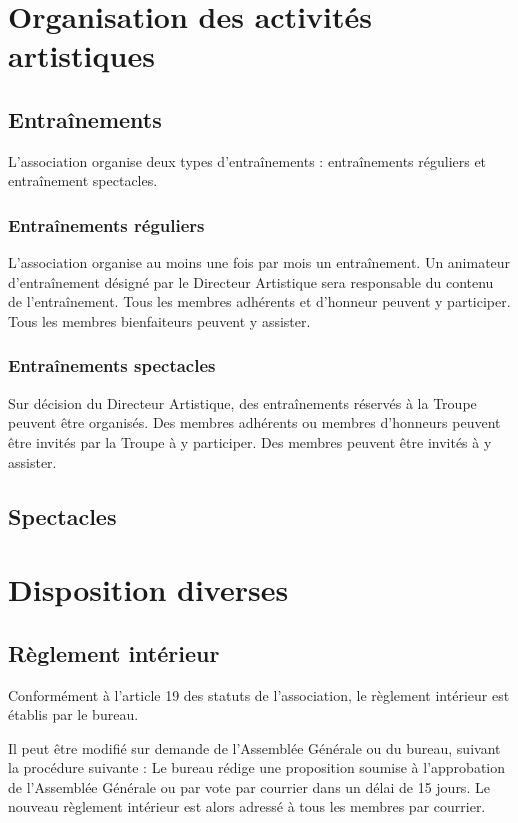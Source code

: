 \documentclass[a4paper,french,10pt]{article}
\begin{document}
\section{Organisation des activités artistiques}
\subsection{Entraînements}
L'association organise deux types d'entraînements : entraînements réguliers et entraînement spectacles.

\subsubsection{Entraînements réguliers}
L'association organise au moins une fois par mois un entraînement. Un animateur d'entraînement désigné par le Directeur Artistique sera responsable du contenu de l'entraînement. Tous les membres adhérents et d'honneur peuvent y participer. Tous les membres bienfaiteurs peuvent y assister.

\subsubsection{Entraînements spectacles}
Sur décision du Directeur Artistique, des entraînements réservés à la Troupe peuvent être organisés. Des membres adhérents ou membres d'honneurs peuvent être invités par la Troupe à y participer. Des membres peuvent être invités à y assister.

\subsection{Spectacles}
\label{sec:spectacles}


\section{Disposition diverses}
\subsection{Règlement intérieur}
Conformément à l'article 19 des statuts de l'association, le règlement intérieur est établis par le bureau.

Il peut être modifié sur demande de l'Assemblée Générale ou du bureau, suivant la procédure suivante :
Le bureau rédige une proposition soumise à l'approbation de l'Assemblée Générale ou par vote par courrier dans un délai de 15 jours.
Le nouveau règlement intérieur est alors adressé à tous les membres par courrier.
\end{document}
